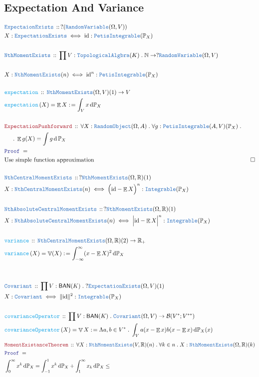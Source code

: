 \documentclass[12pt]{scrartcl}
\newcommand{\TYPE}[1]{\textcolor{NavyBlue}{\mathtt{#1}}}
\newcommand{\FUNC}[1]{\textcolor{Cerulean}{\mathtt{#1}}}
\newcommand{\LOGIC}[1]{\textcolor{Blue}{\mathtt{#1}}}
\newcommand{\THM}[1]{\textcolor{Maroon}{\mathtt{#1}}}
\renewcommand{\.}{\; . \;}
\newcommand{\de}{: \kern 0.1pc =}
\newcommand{\Act}[1]{\left( #1 \right)}
\newcommand{\Theorem}[2]{& \THM{#1} \, :: \, #2 \\ & \Proof = \\ }
\newcommand{\DeclareType}[2]{& \TYPE{#1} \, :: \, #2 \\}
\newcommand{\DefineType}[3]{& #1 : \TYPE{#2} \iff #3 \\}
\newcommand{\DeclareFunc}[2]{& \FUNC{#1} \, :: \, #2 \\}
\newcommand{\DefineNamedFunc}[4]{&  \FUNC{#1}\Act{#2} = #3 \de #4 \\}
\newcommand{\NewLine}{\\ & \kern 1pc}
\newcommand{\Page}[1]{\begin{align*} #1 \end{align*}   }
\newcommand{\Reals}{\mathbb{R} }
\newcommand{\Nat}{\mathbb{N} }
\newcommand{\QED}{\; \square}
\newcommand{\EndProof}{& \QED \\}
\newcommand{\Proof}{\LOGIC{Proof} \; }
\newcommand{\BAN}{\mathsf{BAN}} %
\renewcommand{\O}{\Omega}
\newcommand{\B}{\mathcal{B}}
\renewcommand{\P}{\mathbb{P}}
\newcommand{\RV}{\TYPE{RandomVariable}}
\newcommand{\RO}{\TYPE{RandomObject}}
\DeclareMathOperator*{\Exp}{\mathbb{E}}
\DeclareMathOperator*{\Var}{\mathbb{V}}
\begin{document}
\subsection{Expectation And Variance}
\Page{
	\DeclareType{ExpectaionExists}{?(\RV(\O,V))}
	\DefineType{X}{ExpectationExists}{\mathrm{id} : \TYPE{PetisIntegrable}(\P_X)}
	\\ 
	\DeclareType{NthMomentExists}{\prod V : \TYPE{TopologicalAlgbra}(K) \. \Nat \to ?\RV(\O,V)} \\
	& X : \TYPE{NthMomentExists}(n) \iff \mathrm{id}^n : \TYPE{PetisIntegrable}(\P_X)
	\\  \\
	\DeclareFunc{expectation}{ \TYPE{NthMomentExists}(\O,V)(1) \to V  }
	\DefineNamedFunc{expectation}{X}{\Exp X}{\int_V x \, \mathrm{d}\P_X}
	\\
	\Theorem{ExpectationPushforward}{ \forall X : \RO(\O,A) \. \forall g : \TYPE{PetisIntegrable}(A,V)(\P_X) \. 
	\NewLine
	\. \Exp g(X) = \int g \, \mathrm{d} \, \P_X  }
	& \textrm{Use simple function approximation}
	\EndProof
	\\
	\DeclareType{NthCentralMomentExists}{ ? \TYPE{NthMomentExists}(\O,\Reals)(1)}
	& X : \TYPE{NthCentralMomentExists}(n) \iff   \Big(\mathrm{id} -  \Exp X\Big)^n : \TYPE{Integrable}(\P_X)
	\\ \\
	\DeclareType{NthAbsoluteCentralMomentExists}{ ? \TYPE{NthMomentExists}(\O,\Reals)(1)}
	& X : \TYPE{NthAbsoluteCentralMomentExists}(n) \iff   \Big|\mathrm{id} -  \Exp X\Big|^n : \TYPE{Integrable}(\P_X)
	\\ \\
	\DeclareFunc{variance}{\TYPE{NthCentralMomentExists}(\O,\Reals)(2) \to \Reals_{+}}
	\DefineNamedFunc{variance}{X}{\Var(X)}{\int_{-\infty}^\infty(x - \Exp X)^2 \, \mathrm{d} \P_X  }
	\\ \\
	\DeclareType{Covariant}{\prod V : \BAN(K) \. ?\TYPE{ExpectationExists}(\O,V)(1) }
	\DefineType{X}{Covariant}{ \| \mathrm{id} \|^2 : \TYPE{Integrable}(\P_X) }
	\\ 
	\DeclareFunc{covarianceOperator}{\prod V : \BAN(K) \. \TYPE{Covariant}(\O,V) \to \B( V^*; V^{**}  ) }
	\DefineNamedFunc{covarianceOperator}{X}{\Var X}{ \Lambda a,b \in V^* \. \int_V a(x - \Exp x)b(x - \Exp x) \, \mathrm{d} \P_X(x)  }
}\Page{
	\Theorem{MomentExistanceTheorem}{ \forall X : \TYPE{NthMomentExists}(V,\Reals)(n) \. \forall k \in n \. X : \TYPE{NthMomentExists}(\O,\Reals)(k)  }
	&  \int^\infty_{0} x^k \, \mathrm{d}\P_X = \int^1_{-1} x^k \, \mathrm{d}\P_X + \int_1^\infty  x_k \, \mathrm{d} \P_X \le
}
\end{document}
